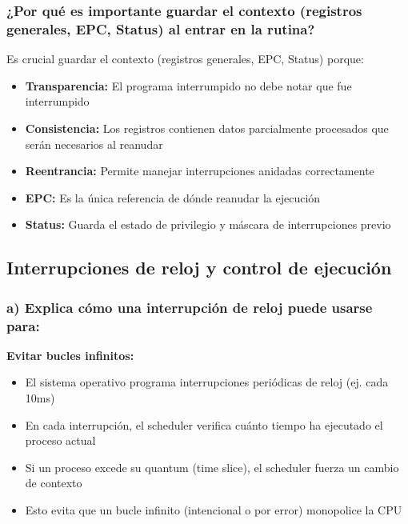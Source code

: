 \documentclass[12pt]{article}
\begin{document}
	\subsubsection{¿Por qué es importante guardar el contexto (registros generales, EPC, Status) al entrar en la rutina?}
	
	Es crucial guardar el contexto (registros generales, EPC, Status) porque:
	\begin{itemize}
		\item \textbf{Transparencia:} El programa interrumpido no debe notar que fue interrumpido
		\item \textbf{Consistencia:} Los registros contienen datos parcialmente procesados que serán necesarios al reanudar
		\item \textbf{Reentrancia:} Permite manejar interrupciones anidadas correctamente
		\item \textbf{EPC:} Es la única referencia de dónde reanudar la ejecución
		\item \textbf{Status:} Guarda el estado de privilegio y máscara de interrupciones previo
	\end{itemize}
	
	\subsection{Interrupciones de reloj y control de ejecución}
	
	\subsubsection{a) Explica cómo una interrupción de reloj puede usarse para:}
	
	\textbf{Evitar bucles infinitos:}
	\begin{itemize}
		\item El sistema operativo programa interrupciones periódicas de reloj (ej. cada 10ms)
		\item En cada interrupción, el scheduler verifica cuánto tiempo ha ejecutado el proceso actual
		\item Si un proceso excede su quantum (time slice), el scheduler fuerza un cambio de contexto
		\item Esto evita que un bucle infinito (intencional o por error) monopolice la CPU
	\end{itemize}
	
\end{document}
